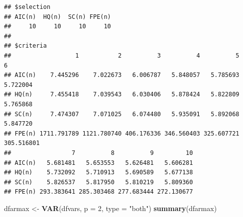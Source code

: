 \documentclass[
]{article}
\newenvironment{Shaded}{\begin{snugshade}}{\end{snugshade}}
\newcommand{\AttributeTok}[1]{\textcolor[rgb]{0.13,0.29,0.53}{#1}}
\newcommand{\DecValTok}[1]{\textcolor[rgb]{0.00,0.00,0.81}{#1}}
\newcommand{\FunctionTok}[1]{\textcolor[rgb]{0.13,0.29,0.53}{\textbf{#1}}}
\newcommand{\NormalTok}[1]{#1}
\newcommand{\OtherTok}[1]{\textcolor[rgb]{0.56,0.35,0.01}{#1}}
\newcommand{\StringTok}[1]{\textcolor[rgb]{0.31,0.60,0.02}{#1}}
\begin{document}
\begin{verbatim}
## $selection
## AIC(n)  HQ(n)  SC(n) FPE(n) 
##     10     10     10     10 
## 
## $criteria
##                  1           2          3          4          5          6
## AIC(n)    7.445296    7.022673   6.006787   5.848057   5.785693   5.722004
## HQ(n)     7.455418    7.039543   6.030406   5.878424   5.822809   5.765868
## SC(n)     7.474307    7.071025   6.074480   5.935091   5.892068   5.847720
## FPE(n) 1711.791789 1121.780740 406.176336 346.560403 325.607721 305.516801
##                 7          8          9         10
## AIC(n)   5.681481   5.653553   5.626481   5.606281
## HQ(n)    5.732092   5.710913   5.690589   5.677138
## SC(n)    5.826537   5.817950   5.810219   5.809360
## FPE(n) 293.383641 285.303468 277.683444 272.130677
\end{verbatim}

\begin{Shaded}
\begin{Highlighting}[]
\NormalTok{dfarmax }\OtherTok{\textless{}{-}} \FunctionTok{VAR}\NormalTok{(dfvars, }\AttributeTok{p =} \DecValTok{2}\NormalTok{, }\AttributeTok{type =} \StringTok{"both"}\NormalTok{)}
\FunctionTok{summary}\NormalTok{(dfarmax)}
\end{Highlighting}
\end{Shaded}
\end{document}
